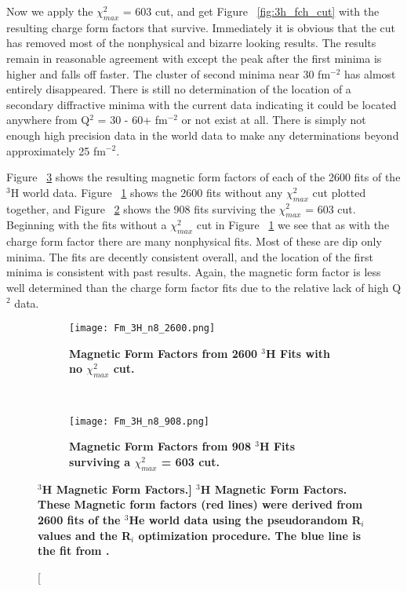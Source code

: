 Now we apply the $\chi^2_{max}$ = 603 cut, and get Figure ~\ref{fig:3h_fch_cut} with the resulting charge form factors that survive. Immediately it is obvious that the cut has removed most of the nonphysical and bizarre looking results. The results remain in reasonable agreement with \cite{Article:Amroun} except the peak after the first minima is higher and falls off faster. The cluster of second minima near 30 fm$^{-2}$ has almost entirely disappeared. There is still no determination of the location of a secondary diffractive minima with the current data indicating it could be located anywhere from  Q$^2$ = 30 - 60+ fm$^{-2}$ or not exist at all. There is simply not enough high precision data in the world data to make any determinations beyond approximately 25 fm$^{-2}$.

Figure ~\ref{fig:3h_fm} shows the resulting magnetic form factors of each of the 2600 fits of the $^3$H world data. Figure ~\ref{fig:3h_fm_no_cut} shows the 2600 fits without any $\chi^2_{max}$ cut plotted together, and Figure ~\ref{fig:3h_fm_cut} shows the 908 fits surviving the $\chi^2_{max}$ = 603 cut. Beginning with the fits without a $\chi^2_{max}$ cut in Figure ~\ref{fig:3h_fm_no_cut} we see that as with the charge form factor there are many nonphysical fits. Most of these are dip only minima. The fits are decently consistent overall, and the location of the first minima is consistent with past results. Again, the magnetic form factor is less well determined than the charge form factor fits due to the relative lack of high Q$^2$ data. 

\begin{figure}[!ht]
\begin{subfigure}{1.\textwidth}
  \centering
  \texttt{[image: Fm\_3H\_n8\_2600.png]}
  \caption{\bf{Magnetic Form Factors from 2600 $^3$H Fits with no $\chi^2_{max}$ cut.}}
  \label{fig:3h_fm_no_cut}
\end{subfigure}\\
\begin{subfigure}{1.\textwidth}
  \centering
  \texttt{[image: Fm\_3H\_n8\_908.png]}
  \caption{\bf{Magnetic Form Factors from 908 $^3$H Fits surviving a $\chi^2_{max}$ = 603 cut.}}
  \label{fig:3h_fm_cut}
\end{subfigure}
\caption[\bf{$^3$H Magnetic Form Factors.}] {
{\bf{$^3$H Magnetic Form Factors.}} These Magnetic form factors (red lines) were derived from 2600 fits of the $^3$He world data using the pseudorandom R$_i$ values and the R$_i$ optimization procedure. The blue line is the fit from \cite{Article:Amroun}.}
\label{fig:3h_fm}
\end{figure}

